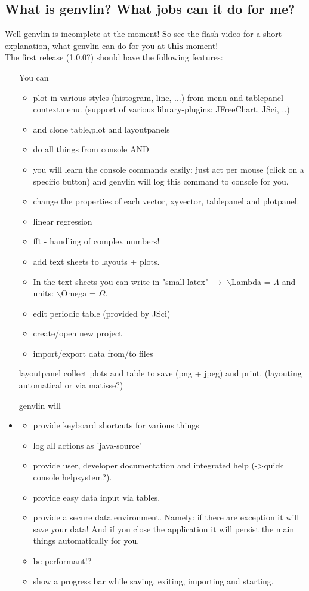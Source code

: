 \documentclass[12pt]{article}
\begin{document}
\subsection{What is genvlin? What jobs can it do for me?}
Well genvlin is incomplete at the moment! So see the flash video for a short explanation, what genvlin can do for you at {\bf this} moment!\\
The first release (1.0.0?) should have the following features:
\begin{itemize}
\item[You can]
	\begin{itemize}
	\item plot in various styles (histogram, line, ...) from menu and tablepanel-contextmenu.
    		(support of various library-plugins: JFreeChart, JSci, ..)
	\item and clone table,plot and layoutpanels
	\item do all things from console AND
	\item you will learn the console commands easily: just act per mouse (click on a specific button)
    		and genvlin will log this command to console for you.
	\item change the properties of each vector, xyvector, tablepanel and plotpanel.
	\item linear regression
	\item fft - handling of complex numbers!
	\item add text sheets to layouts + plots.
	\item In the text sheets you can write in "small latex" $\rightarrow$ $\backslash$Lambda = $\Lambda$ and units: $\backslash$Omega = $\Omega$.
	\item edit periodic table (provided by JSci)
	\item create/open new project
	\item import/export data from/to files
	\end{itemize}
\item[layoutpanel]
collect plots and table to save (png + jpeg) and print. (layouting automatical or via matisse?)\\

\item[genvlin will]
\item
\begin{itemize}

	\item provide keyboard shortcuts for various things
	\item log all actions as 'java-source'
	\item provide user, developer documentation and integrated help (->quick console helpsystem?).
	\item provide easy data input via tables.
	\item provide a secure data environment.
    		Namely: if there are exception it will save your data! And if you close
    		the application it will persist the main things automatically for you.
	\item be performant!?
	\item show a progress bar while saving, exiting, importing and starting.
	

\end{itemize}
\end{itemize}
\end{document}
